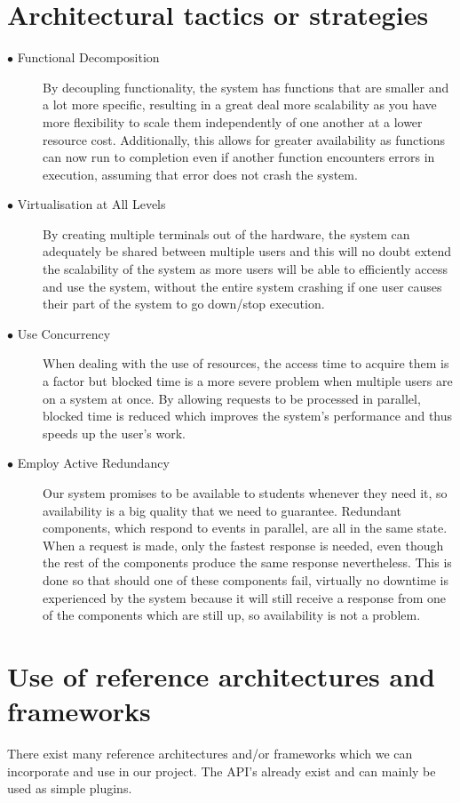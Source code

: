 \documentclass[hidelinks, 12pt]{article}
\begin{document}
\section{Architectural tactics or strategies}
\begin{description}
  \item[$\bullet$ Functional Decomposition]
  By decoupling functionality, the system has functions that are smaller and a lot more specific, resulting in a great deal more scalability as you have more flexibility to scale them independently of one another at a lower resource cost. Additionally, this allows for greater availability as functions can now run to completion even if another function encounters errors in execution, assuming that error does not crash the system.
  \item[$\bullet$ Virtualisation at All Levels]
  By creating multiple terminals out of the hardware, the system can adequately be shared between multiple users and this will no doubt extend the scalability of the system as more users will be able to efficiently access and use the system, without the entire system crashing if one user causes their part of the system to go down/stop execution.
  \item[$\bullet$ Use Concurrency]
  When dealing with the use of resources, the access time to acquire them is a factor but blocked time is a more severe problem when multiple users are on a system at once. By allowing requests to be processed in parallel, blocked time is reduced which improves the system's performance and thus speeds up the user's work.
  \item[$\bullet$ Employ Active Redundancy]
  Our system promises to be available to students whenever they need it, so availability is a big quality that we need to guarantee.
  Redundant components, which respond to events in parallel, are all in the same state. When a request is made, only the fastest response is needed, even though the rest of the components produce the same response nevertheless. This is done so that should one of these components fail, virtually no downtime is experienced by the system because it will still receive a response from one of the components which are still up, so availability is not a problem. 
\end{description}

\section{Use of reference architectures and frameworks}
There exist many reference architectures and/or frameworks which we can incorporate and use in our project. The API's already exist and can mainly be used as simple plugins.
\end{document}
